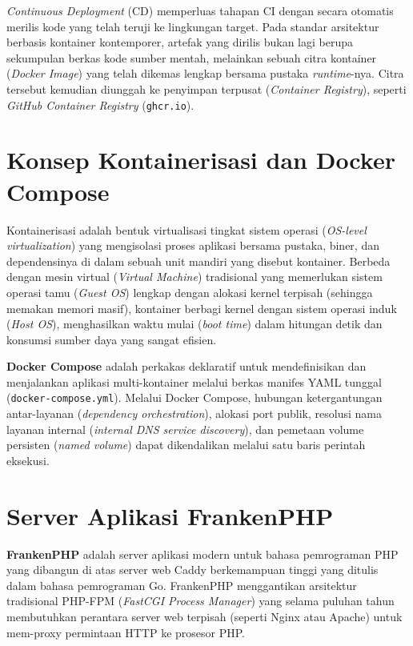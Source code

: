 \documentclass[a4paper,oneside,11pt]{book}
\begin{document}
\textit{Continuous Deployment} (CD) memperluas tahapan CI dengan secara otomatis merilis kode yang telah teruji ke lingkungan target. Pada standar arsitektur berbasis kontainer kontemporer, artefak yang dirilis bukan lagi berupa sekumpulan berkas kode sumber mentah, melainkan sebuah citra kontainer (\textit{Docker Image}) yang telah dikemas lengkap bersama pustaka \textit{runtime}-nya. Citra tersebut kemudian diunggah ke penyimpan terpusat (\textit{Container Registry}), seperti \textit{GitHub Container Registry} (\texttt{ghcr.io}).

\section{Konsep Kontainerisasi dan Docker Compose}
Kontainerisasi adalah bentuk virtualisasi tingkat sistem operasi (\textit{OS-level virtualization}) yang mengisolasi proses aplikasi bersama pustaka, biner, dan dependensinya di dalam sebuah unit mandiri yang disebut kontainer. Berbeda dengan mesin virtual (\textit{Virtual Machine}) tradisional yang memerlukan sistem operasi tamu (\textit{Guest OS}) lengkap dengan alokasi kernel terpisah (sehingga memakan memori masif), kontainer berbagi kernel dengan sistem operasi induk (\textit{Host OS}), menghasilkan waktu mulai (\textit{boot time}) dalam hitungan detik dan konsumsi sumber daya yang sangat efisien.

\textbf{Docker Compose} adalah perkakas deklaratif untuk mendefinisikan dan menjalankan aplikasi multi-kontainer melalui berkas manifes YAML tunggal (\texttt{docker-compose.yml}). Melalui Docker Compose, hubungan ketergantungan antar-layanan (\textit{dependency orchestration}), alokasi port publik, resolusi nama layanan internal (\textit{internal DNS service discovery}), dan pemetaan volume persisten (\textit{named volume}) dapat dikendalikan melalui satu baris perintah eksekusi.

\section{Server Aplikasi FrankenPHP}
\textbf{FrankenPHP} adalah server aplikasi modern untuk bahasa pemrograman PHP yang dibangun di atas server web Caddy berkemampuan tinggi yang ditulis dalam bahasa pemrograman Go. FrankenPHP menggantikan arsitektur tradisional PHP-FPM (\textit{FastCGI Process Manager}) yang selama puluhan tahun membutuhkan perantara server web terpisah (seperti Nginx atau Apache) untuk mem-proxy permintaan HTTP ke prosesor PHP. 
\end{document}
